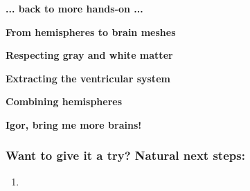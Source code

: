 \documentclass[10pt, mathserif, aspectratio=169, t]{beamer}
\newcommand{\mysection}[1]{\begin{frame} \begin{center} \vspace{3em} \textbf{#1} \end{center} \end{frame}}
\newcommand{\videosection}[3]{\begin{frame} \begin{center} \vspace{3em} \href{#2}{\textcolor{rognesred}{\textbf{#1}}} \end{center} #3 \end{frame}}
\begin{document}


\mysection{... back to more hands-on ...}

\mysection{From hemispheres to brain meshes}

\mysection{Respecting gray and white matter}


\mysection{Extracting the ventricular system}


\mysection{Combining hemispheres}






\mysection{Igor, bring me more brains!}
 
\begin{frame}
\frametitle{Want to give it a try? Natural next steps:}
\begin{enumerate}
\item
\end{enumerate}
\end{frame}

\end{document}
